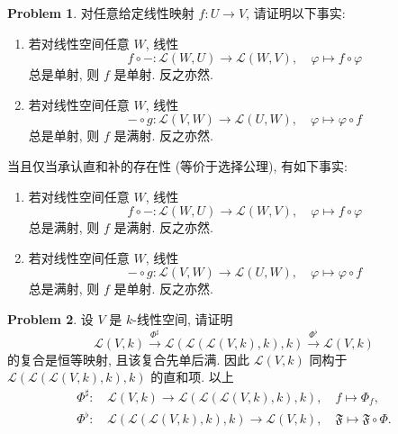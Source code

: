 \documentclass{MainStyle}
\theoremstyle{definition}
\newtheorem{problem}{Problem}
\begin{document}
\begin{problem}
对任意给定线性映射 $f:U\to V$, 请证明以下事实:
\begin{enumerate}
    \item 若对线性空间任意 $W$, 线性
          \begin{equation}
              f\circ-:\mathcal L(W,U)\to \mathcal L(W,V),\quad \varphi \mapsto f\circ \varphi
          \end{equation}
          总是单射, 则 $f$ 是单射. 反之亦然.
    \item 若对线性空间任意 $W$, 线性
          \begin{equation}
              -\circ g:\mathcal L(V,W)\to \mathcal L(U,W),\quad \varphi \mapsto  \varphi\circ f
          \end{equation}
          总是单射, 则 $f$ 是满射. 反之亦然.
\end{enumerate}
当且仅当承认直和补的存在性 (等价于选择公理), 有如下事实:
\begin{enumerate}
    \item 若对线性空间任意 $W$, 线性
          \begin{equation}
              f\circ-:\mathcal L(W,U)\to \mathcal L(W,V),\quad \varphi \mapsto f\circ \varphi
          \end{equation}
          总是满射, 则 $f$ 是满射. 反之亦然.
    \item 若对线性空间任意 $W$, 线性
          \begin{equation}
              -\circ g:\mathcal L(V,W)\to \mathcal L(U,W),\quad \varphi \mapsto  \varphi\circ f
          \end{equation}
          总是满射, 则 $f$ 是单射. 反之亦然.
\end{enumerate}
\end{problem}

\begin{problem}
设 $V$ 是 $k$-线性空间, 请证明
\begin{equation}
    \mathcal L( V,k)\overset {\Phi^\sharp }\to \mathcal L(\mathcal L(\mathcal L( V,k),k),k) \overset{\Phi^\flat}\longrightarrow \mathcal L(V,k)
\end{equation}
的复合是恒等映射, 且该复合先单后满. 因此 $\mathcal L(V,k)$ 同构于 $\mathcal L(\mathcal L(\mathcal L(V,k),k),k)$ 的直和项. 以上
\begin{align}
    \Phi^\sharp : & \,\mathcal L(V,k)\to \mathcal L(\mathcal L(\mathcal L(V,k),k),k), \quad f\mapsto \Phi_f,                          \\[4pt]
    \Phi^\flat :  & \,\mathcal L(\mathcal L(\mathcal L(V,k),k),k)\to \mathcal L(V,k), \quad \mathfrak F\mapsto \mathfrak F\circ \Phi.
\end{align}
\end{problem}
\end{document}

